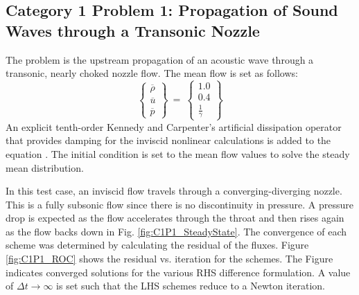 \documentclass[conf]{new-aiaa}
\begin{document}

 
\subsection{Category 1 Problem 1: Propagation of Sound Waves through a Transonic Nozzle}

The problem is the upstream propagation of an acoustic wave through a transonic, nearly choked nozzle flow. 
The mean flow is set as follows:
\begin{equation*}
	\left\{
	\begin{matrix}
		\overline{\rho} \\
		\overline{u} \\
		\overline{p}
	\end{matrix}
	\right\}~=~
	\left\{
	\begin{matrix}
		1.0 \\
		0.4 \\
		\frac{1}{\gamma}
	\end{matrix}
	\right\}
\end{equation*}
An explicit tenth-order Kennedy and Carpenter's artificial dissipation operator that provides damping for the inviscid nonlinear calculations is added to the equation \cite{Kennedy_Carp}. The initial condition is set to the mean flow values to solve the steady mean distribution. 

In this test case, an inviscid flow travels through a converging-diverging nozzle. 
This is a fully subsonic flow since there is no discontinuity in pressure.
A pressure drop is expected as the flow accelerates through the throat and then rises again as the flow backs down in Fig. \ref{fig:C1P1_SteadyState}.  
The convergence of each scheme was determined by calculating the residual of the fluxes. 
Figure \ref{fig:C1P1_ROC} shows the residual vs. iteration for the schemes. 
The Figure indicates converged solutions for the various RHS difference formulation. 
A value of $\Delta{t}\to\infty$ is set such that the LHS schemes reduce to a Newton iteration. 
\end{document}
